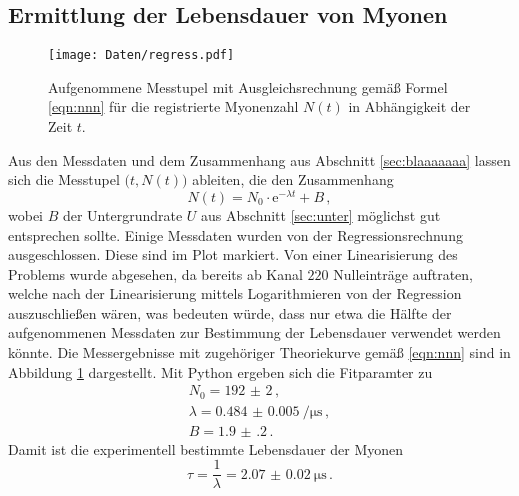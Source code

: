 %
\FloatBarrier
\subsection{Ermittlung der Lebensdauer von Myonen}
\begin{figure}
  \centering
  \texttt{[image: Daten/regress.pdf]}
	\caption{Aufgenommene Messtupel mit Ausgleichsrechnung gemäß Formel \eqref{eqn:nnn} für die registrierte Myonenzahl $N(t)$ in Abhängigkeit der Zeit $t$.}
  \label{fig:blubbb}
\end{figure}

Aus den Messdaten und dem Zusammenhang aus Abschnitt \ref{sec:blaaaaaaa} lassen sich die
Messtupel $\big(t, N(t)\big)$ ableiten, die den Zusammenhang
\begin{equation}
	\label{eqn:nnn}
	N(t) = N_0 \cdot \mathrm{e}^{-\lambda t} + B \, \mathrm{,}
\end{equation}
wobei $B$ der Untergrundrate $U$ aus Abschnitt \ref{sec:unter} möglichst gut entsprechen sollte.
Einige Messdaten wurden von der Regressionsrechnung ausgeschlossen. Diese sind im Plot markiert.
Von einer Linearisierung des Problems wurde abgesehen, da bereits ab Kanal $220$ Nulleinträge auftraten, welche nach der Linearisierung mittels Logarithmieren von der Regression auszuschließen wären, was bedeuten würde, dass nur etwa die Hälfte der aufgenommenen Messdaten zur Bestimmung der Lebensdauer verwendet werden könnte.
Die Messergebnisse mit zugehöriger Theoriekurve gemäß \eqref{eqn:nnn} sind in Abbildung
\ref{fig:blubbb} dargestellt.
Mit Python \cite{numpy} ergeben sich die Fitparamter zu
\begin{align*}
	N_0 = \num{192(2)}\, \mathrm{,} \\
	\lambda = \SI{0.484(5)}{\per\micro\second} \, \mathrm{,}\\
	B=\num{1.9(2)}\,\text{.}
\end{align*}
Damit ist die experimentell bestimmte Lebensdauer der Myonen
\begin{equation*}
	\tau = \frac{1}{\lambda} = \SI{2.07(2)}{\micro\second} \, \mathrm{.}
\end{equation*}
